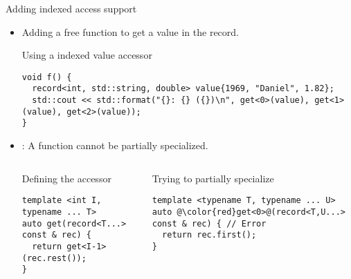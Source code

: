 \begin{frame}[t,fragile]{Adding indexed access support}
\begin{itemize}
  \item Adding a free function to get a value in the record.

\begin{block}{Using a indexed value accessor}
\begin{lstlisting}
void f() {
  record<int, std::string, double> value{1969, "Daniel", 1.82};
  std::cout << std::format("{}: {} ({})\n", get<0>(value), get<1>(value), get<2>(value));
}
\end{lstlisting}
\end{block}

  \item {}: A function cannot be partially specialized.


\begin{columns}[T]

\begin{block}{Defining the accessor}
\begin{lstlisting}
template <int I, typename ... T>
auto get(record<T...> const & rec) {
  return get<I-1>(rec.rest());
}
\end{lstlisting}
\end{block}

\pause
{}
\begin{block}{Trying to partially specialize}
\begin{lstlisting}[escapechar=@]
template <typename T, typename ... U>
auto @\color{red}get<0>@(record<T,U...> const & rec) { // Error
  return rec.first();
}
\end{lstlisting}
\end{block}

\end{columns}
\end{itemize}
\end{frame}

